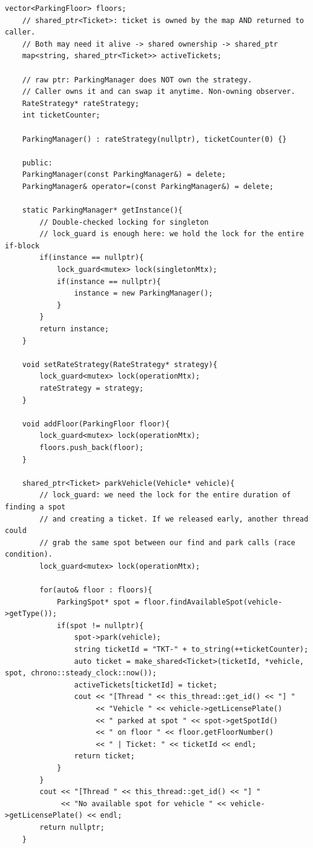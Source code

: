 \documentclass[11pt,a4paper]{article}
\begin{document}
\begin{lstlisting}[title={\texttt{managers.hpp}}]
    vector<ParkingFloor> floors;
    // shared_ptr<Ticket>: ticket is owned by the map AND returned to caller.
    // Both may need it alive -> shared ownership -> shared_ptr
    map<string, shared_ptr<Ticket>> activeTickets;

    // raw ptr: ParkingManager does NOT own the strategy.
    // Caller owns it and can swap it anytime. Non-owning observer.
    RateStrategy* rateStrategy;
    int ticketCounter;

    ParkingManager() : rateStrategy(nullptr), ticketCounter(0) {}

    public:
    ParkingManager(const ParkingManager&) = delete;
    ParkingManager& operator=(const ParkingManager&) = delete;

    static ParkingManager* getInstance(){
        // Double-checked locking for singleton
        // lock_guard is enough here: we hold the lock for the entire if-block
        if(instance == nullptr){
            lock_guard<mutex> lock(singletonMtx);
            if(instance == nullptr){
                instance = new ParkingManager();
            }
        }
        return instance;
    }

    void setRateStrategy(RateStrategy* strategy){
        lock_guard<mutex> lock(operationMtx);
        rateStrategy = strategy;
    }

    void addFloor(ParkingFloor floor){
        lock_guard<mutex> lock(operationMtx);
        floors.push_back(floor);
    }

    shared_ptr<Ticket> parkVehicle(Vehicle* vehicle){
        // lock_guard: we need the lock for the entire duration of finding a spot
        // and creating a ticket. If we released early, another thread could
        // grab the same spot between our find and park calls (race condition).
        lock_guard<mutex> lock(operationMtx);

        for(auto& floor : floors){
            ParkingSpot* spot = floor.findAvailableSpot(vehicle->getType());
            if(spot != nullptr){
                spot->park(vehicle);
                string ticketId = "TKT-" + to_string(++ticketCounter);
                auto ticket = make_shared<Ticket>(ticketId, *vehicle, spot, chrono::steady_clock::now());
                activeTickets[ticketId] = ticket;
                cout << "[Thread " << this_thread::get_id() << "] "
                     << "Vehicle " << vehicle->getLicensePlate()
                     << " parked at spot " << spot->getSpotId()
                     << " on floor " << floor.getFloorNumber()
                     << " | Ticket: " << ticketId << endl;
                return ticket;
            }
        }
        cout << "[Thread " << this_thread::get_id() << "] "
             << "No available spot for vehicle " << vehicle->getLicensePlate() << endl;
        return nullptr;
    }


\end{lstlisting}
\end{document}
